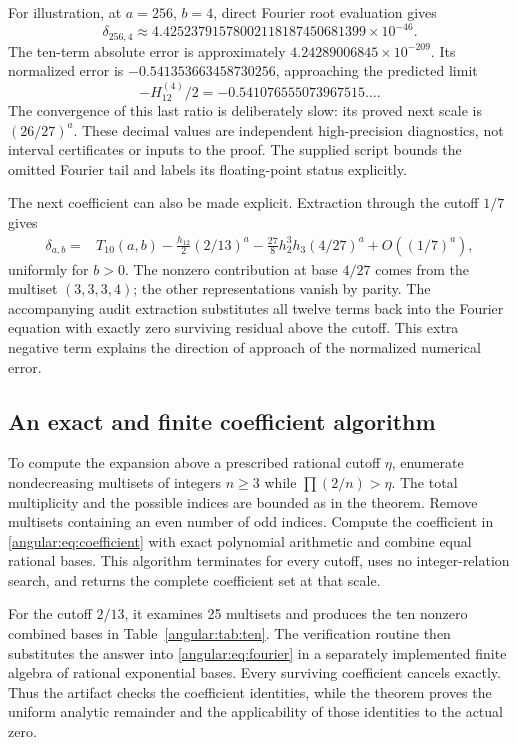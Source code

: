 \documentclass[11pt,a4paper]{article}
\theoremstyle{definition}
\theoremstyle{remark}
\numberwithin{equation}{section}
\begin{document}
For illustration, at $a=256$, $b=4$, direct Fourier root evaluation
gives
\[
 \delta_{256,4}\approx4.42523791578002118187450681399\times10^{-46}.
\]
The ten-term absolute error is approximately $4.24289006845\times10^{-209}$.
Its normalized error is $-0.541353663458730256$, approaching the
predicted limit
\[
 -H_{12}^{(4)}/2=-0.541076555073967515\ldots.
\]
The convergence of this last ratio is deliberately slow: its proved
next scale is $(26/27)^a$.  These decimal values are independent
high-precision diagnostics, not interval certificates or inputs to
the proof.  The supplied script bounds the omitted Fourier tail and
labels its floating-point status explicitly.

The next coefficient can also be made explicit. Extraction through the
cutoff $1/7$ gives
\begin{align*}
 \delta_{a,b}={}&T_{10}(a,b)-\frac{h_{12}}2(2/13)^a
 -\frac{27}{8}h_2^3h_3(4/27)^a+O((1/7)^a),
\end{align*}
uniformly for $b>0$. The nonzero contribution at base $4/27$ comes
from the multiset $(3,3,3,4)$; the other representations vanish by
parity. The accompanying audit extraction substitutes all twelve
terms back into the Fourier equation with exactly zero surviving
residual above the cutoff. This extra negative term explains the
direction of approach of the normalized numerical error.

\subsection{An exact and finite coefficient algorithm}

To compute the expansion above a prescribed rational cutoff $\eta$,
enumerate nondecreasing multisets of integers $n\geq3$ while
$\prod(2/n)>\eta$.  The total multiplicity and the possible indices
are bounded as in the theorem. Remove multisets containing an even
number of odd indices. Compute the coefficient in
\eqref{angular:eq:coefficient} with exact polynomial arithmetic and
combine equal rational bases. This algorithm terminates for every
cutoff, uses no integer-relation search, and returns the complete
coefficient set at that scale.

For the cutoff $2/13$, it examines 25 multisets and produces the ten
nonzero combined bases in Table~\ref{angular:tab:ten}. The verification
routine then substitutes the answer into \eqref{angular:eq:fourier}
in a separately implemented finite algebra of rational exponential
bases. Every surviving coefficient cancels exactly. Thus the artifact
checks the coefficient identities, while the theorem proves the
uniform analytic remainder and the applicability of those identities
to the actual zero.
\end{document}

